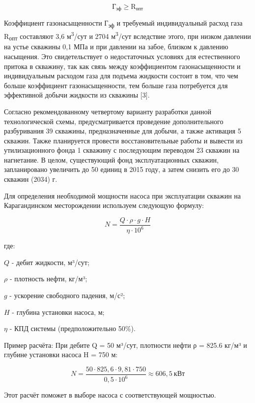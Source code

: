 \begin{multicols}{2}
\begin{equation}
\text{Г}_{\text{эф}}\ge \text{R}_{\text{опт}}
\end{equation}

Коэффициент газонасыщенности Г\textsubscript{эф} и требуемый
индивидуальный расход газа R\textsubscript{опт} составляют 3,6
м\textsuperscript{3}/сут и 2704 м\textsuperscript{3}/сут вследствие
этого, при низком давлении на устье скважины 0,1 МПа и при давлении на
забое, близком к давлению насыщения. Это свидетельствует о недостаточных
условиях для естественного притока в скважину, так как связь между
коэффициентом газонасыщенности и индивидуальным расходом газа для
подъема жидкости состоит в том, что чем больше коэффициент
газонасыщенности, тем больше газа потребуется для эффективной добычи
жидкости из скважины {[}3{]}.

Согласно рекомендованному четвертому варианту разработки данной
технологической схемы, предусматривается проведение дополнительного
разбуривания 39 скважины, предназначенные для добычи, а также активация
5 скважин. Также планируется провести восстановительные работы и вывести
из утилизационного фонда 1 скважину с последующим переводом 23 скважин
на нагнетание. В целом, существующий фонд эксплуатационных скважин,
запланировано увеличить до 50 единиц в 2015 году, а затем снизить его до
30 скважин (2034) г.

Для определения необходимой мощности насоса при эксплуатации скважин
на Карагандинском месторождении используем следующую формулу:

\begin{equation}
N = \frac{Q \cdot \rho \cdot g \cdot H}{\eta \cdot 10^{6}}
\end{equation}

где:

$Q$ - дебит жидкости, м³/сут;

$\rho$ - плотность нефти, кг/м³;

$g$ - ускорение свободного падения, м/с²;

$H$ - глубина установки насоса, м;

$\eta$ - КПД системы (предположительно 50\%).

Пример расчёта: При дебите Q = 50 м³/сут, плотности нефти ρ = 825.6 кг/м³ и глубине установки насоса H = 750 м:

\[N = \frac{50 \cdot 825,6 \cdot 9,81 \cdot 750}{0,5 \cdot 10^{6}} \approx 606,5\ \text{кВт}\]

Этот расчёт поможет в выборе насоса с соответствующей мощностью.


\end{multicols}
